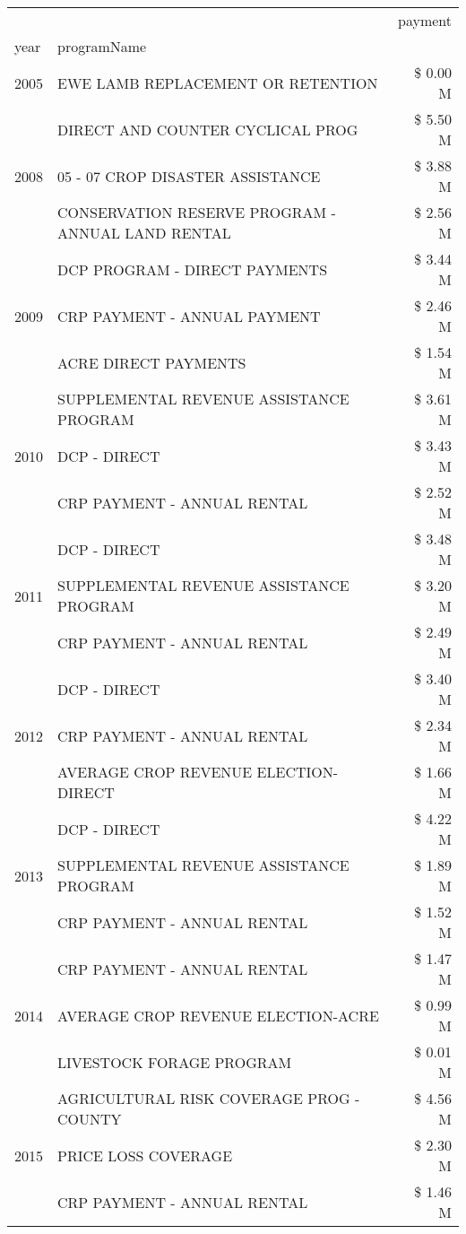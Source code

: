 \begin{tabular}{llr}
\toprule
 &  & payment \\
year & programName &  \\
\midrule
2005 & EWE LAMB REPLACEMENT OR RETENTION & \$ 0.00 M \\
\cline{1-3}
\multirow[t]{3}{*}{2008} & DIRECT AND COUNTER CYCLICAL PROG & \$ 5.50 M \\
 & 05 - 07 CROP DISASTER ASSISTANCE & \$ 3.88 M \\
 & CONSERVATION RESERVE PROGRAM - ANNUAL LAND RENTAL & \$ 2.56 M \\
\cline{1-3}
\multirow[t]{3}{*}{2009} & DCP PROGRAM - DIRECT PAYMENTS & \$ 3.44 M \\
 & CRP PAYMENT - ANNUAL PAYMENT & \$ 2.46 M \\
 & ACRE DIRECT PAYMENTS & \$ 1.54 M \\
\cline{1-3}
\multirow[t]{3}{*}{2010} & SUPPLEMENTAL REVENUE ASSISTANCE PROGRAM & \$ 3.61 M \\
 & DCP - DIRECT & \$ 3.43 M \\
 & CRP PAYMENT - ANNUAL RENTAL & \$ 2.52 M \\
\cline{1-3}
\multirow[t]{3}{*}{2011} & DCP - DIRECT & \$ 3.48 M \\
 & SUPPLEMENTAL REVENUE ASSISTANCE PROGRAM & \$ 3.20 M \\
 & CRP PAYMENT - ANNUAL RENTAL & \$ 2.49 M \\
\cline{1-3}
\multirow[t]{3}{*}{2012} & DCP - DIRECT & \$ 3.40 M \\
 & CRP PAYMENT - ANNUAL RENTAL & \$ 2.34 M \\
 & AVERAGE CROP REVENUE ELECTION-DIRECT & \$ 1.66 M \\
\cline{1-3}
\multirow[t]{3}{*}{2013} & DCP - DIRECT & \$ 4.22 M \\
 & SUPPLEMENTAL REVENUE ASSISTANCE PROGRAM & \$ 1.89 M \\
 & CRP PAYMENT - ANNUAL RENTAL & \$ 1.52 M \\
\cline{1-3}
\multirow[t]{3}{*}{2014} & CRP PAYMENT - ANNUAL RENTAL & \$ 1.47 M \\
 & AVERAGE CROP REVENUE ELECTION-ACRE & \$ 0.99 M \\
 & LIVESTOCK FORAGE PROGRAM & \$ 0.01 M \\
\cline{1-3}
\multirow[t]{3}{*}{2015} & AGRICULTURAL RISK COVERAGE PROG - COUNTY & \$ 4.56 M \\
 & PRICE LOSS COVERAGE & \$ 2.30 M \\
 & CRP PAYMENT - ANNUAL RENTAL & \$ 1.46 M \\

\end{tabular}
